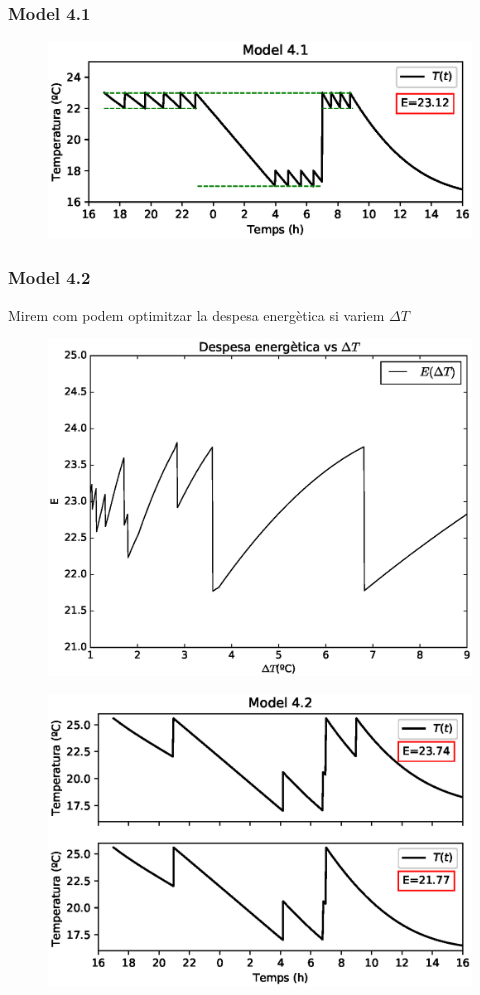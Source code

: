 \documentclass[11pt]{article}
\begin{document}
\subsubsection*{Model 4.1}

\begin{figure}[h!]
	\centering
	\includegraphics[width=13cm]{model41.eps}
\end{figure}
\subsubsection*{Model 4.2}
Mirem com podem optimitzar la despesa energètica si variem $\Delta T$
\begin{figure}[h!]
	\centering
	\includegraphics[width=13cm]{despesa.eps}
\end{figure}
\begin{figure}[h!]
	\centering
	\includegraphics[width=13cm]{model42.eps}
\end{figure}
\end{document}
